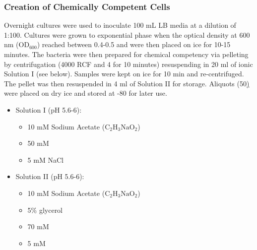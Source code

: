 \subsubsection{Creation of Chemically Competent Cells}
		Overnight cultures were used to inoculate 100 mL LB media at a dilution of 1:100. Cultures were grown to exponential phase when the optical density at 600 nm (OD$_{600}$) reached between 0.4-0.5 and were then placed on ice for 10-15 minutes. The bacteria were then prepared for chemical competency via pelleting by centrifugation (4000 RCF and 4\degC{} for 10 minutes) resuspending in 20 ml of ionic Solution I (see below). Samples were kept on ice for 10 min and re-centrifuged. The pellet was then resuspended in 4 ml of Solution II for storage. Aliquots (50\ul) were placed on dry ice and stored at -80\degC{} for later use.
		\small
		\begin{itemize}
		\item Solution I (pH 5.6-6):
			\begin{itemize}
			\item 10 mM Sodium Acetate ($\mathrm{C}_{2}\mathrm{H}_{3}\mathrm{Na}\mathrm{O}_{2}$)
			\item 50 mM \MnCl
			\item 5 mM NaCl
			\end{itemize}
		\item Solution II (pH 5.6-6):
			\begin{itemize}
			\item 10 mM Sodium Acetate ($\mathrm{C}_{2}\mathrm{H}_{3}\mathrm{Na}\mathrm{O}_{2}$)
			\item 5\% glycerol
			\item 70 mM \CaCl
			\item 5 mM \MnCl
			\end{itemize}
		\end{itemize}
		\normalsize

